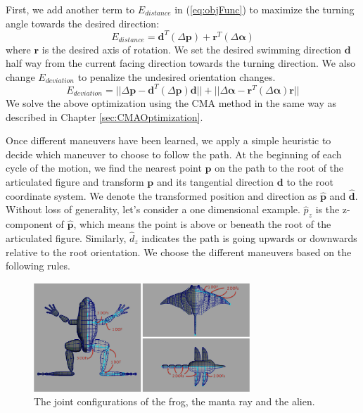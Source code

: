 First, we add another term to $E_{distance}$ in (\ref{eq:objFunc}) to maximize the turning angle towards the desired direction:
\begin{displaymath}
E_{distance}=\mathbf{d}^T(\Delta \mathbf{p})+\mathbf{r}^T(\Delta\mathbf{\alpha})
\end{displaymath}
where $\mathbf{r}$ is the desired axis of rotation. We set the desired swimming direction $\mathbf{d}$ half way from the current facing direction towards the turning direction. We also change $E_{deviation}$ to penalize the undesired orientation changes.
\begin{displaymath}
E_{deviation} = ||\Delta\mathbf{p}-\mathbf{d}^T(\Delta\mathbf{p})\mathbf{d}|| + ||\Delta\mathbf{\alpha}-\mathbf{r}^T(\Delta\mathbf{\alpha})\mathbf{r}||
\end{displaymath}
We solve the above optimization using the CMA method in the same way as described in Chapter \ref{sec:CMAOptimization}.

Once different maneuvers have been learned, we apply a simple heuristic to
decide which maneuver to choose to follow the path. At the beginning of
each cycle of the motion, we find the nearest point $\mathbf{p}$ on the
path to the root of the articulated figure and transform $\mathbf{p}$ and
its tangential direction $\mathbf{d}$ to the root coordinate system. We
denote the transformed position and direction as $\hat{\mathbf{p}}$ and
$\hat{\mathbf{d}}$. Without loss of generality, let's consider a one
dimensional example. $\hat{p}_z$ is the z-component of $\hat{\mathbf{p}}$,
which means the point is above or beneath the root of the articulated
figure. Similarly, $\hat{d}_z$ indicates the path is going upwards or
downwards relative to the root orientation. We choose the different
maneuvers based on the following rules.

\begin{figure}[!t]
\centering
\includegraphics[width=3.2in]{figures/skels.eps}
\caption{The joint configurations of the frog, the manta ray and the alien.}
\label{fig:skels}
\end{figure}

